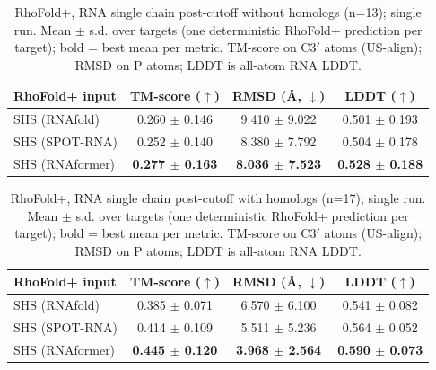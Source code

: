 \begin{table}[htbp]
\centering
\caption{RhoFold+, RNA single chain post-cutoff without homologs (n=13); single run. Mean $\pm$ s.d. over targets (one deterministic RhoFold+ prediction per target); bold = best mean per metric. TM-score on C3$'$ atoms (US-align); RMSD on P atoms; LDDT is all-atom RNA LDDT.}
\label{tab:rf_rna_single_chain_post_cutoff_without_homologs}
\begin{tabular}{lccc}
\toprule
RhoFold+ input & TM-score ($\uparrow$) & RMSD (\AA, $\downarrow$) & LDDT ($\uparrow$) \\
\midrule
SHS (RNAfold) & 0.260 $\pm$ 0.146 & 9.410 $\pm$ 9.022 & 0.501 $\pm$ 0.193 \\
SHS (SPOT-RNA) & 0.252 $\pm$ 0.140 & 8.380 $\pm$ 7.792 & 0.504 $\pm$ 0.178 \\
SHS (RNAformer) & \textbf{0.277 $\pm$ 0.163} & \textbf{8.036 $\pm$ 7.523} & \textbf{0.528 $\pm$ 0.188} \\
\bottomrule
\end{tabular}
\end{table}

\begin{table}[htbp]
\centering
\caption{RhoFold+, RNA single chain post-cutoff with homologs (n=17); single run. Mean $\pm$ s.d. over targets (one deterministic RhoFold+ prediction per target); bold = best mean per metric. TM-score on C3$'$ atoms (US-align); RMSD on P atoms; LDDT is all-atom RNA LDDT.}
\label{tab:rf_rna_single_chain_post_cutoff_with_homologs}
\begin{tabular}{lccc}
\toprule
RhoFold+ input & TM-score ($\uparrow$) & RMSD (\AA, $\downarrow$) & LDDT ($\uparrow$) \\
\midrule
SHS (RNAfold) & 0.385 $\pm$ 0.071 & 6.570 $\pm$ 6.100 & 0.541 $\pm$ 0.082 \\
SHS (SPOT-RNA) & 0.414 $\pm$ 0.109 & 5.511 $\pm$ 5.236 & 0.564 $\pm$ 0.052 \\
SHS (RNAformer) & \textbf{0.445 $\pm$ 0.120} & \textbf{3.968 $\pm$ 2.564} & \textbf{0.590 $\pm$ 0.073} \\
\bottomrule
\end{tabular}
\end{table}

